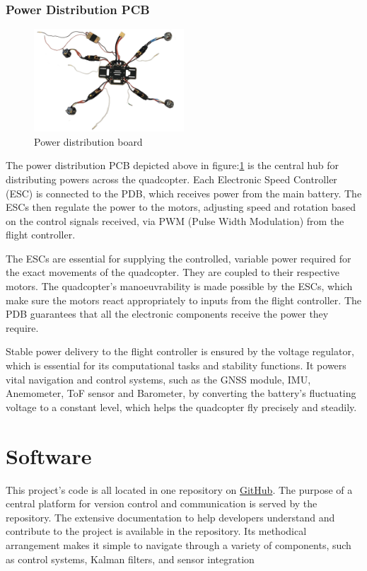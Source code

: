 \documentclass{article}
\begin{document}
\subsubsection{Power Distribution PCB}
\begin{figure}[H]
  \centering
  \includegraphics[width=0.5\textwidth]{Pictures/power_distribution_and_escs.png}
  \caption{Power distribution board}
  \label{fig:power_distribution}
\end{figure}
The power distribution PCB depicted above in figure:\ref{fig:power_distribution}
is the central hub for distributing powers across the quadcopter. Each
Electronic Speed Controller (ESC) is connected to the PDB, which receives power
from the main battery. The ESCs then regulate the power to the motors, adjusting
speed and rotation based on the control signals received, via PWM (Pulse Width
Modulation) from the flight controller.

The ESCs are essential for supplying the controlled, variable power required for
the exact movements of the quadcopter. They are coupled to their respective
motors. The quadcopter's manoeuvrability is made possible by the ESCs, which
make sure the motors react appropriately to inputs from the flight controller.
The PDB guarantees that all the electronic components receive the power they
require.

Stable power delivery to the flight controller is ensured by the voltage
regulator, which is essential for its computational tasks and stability
functions. It powers vital navigation and control systems, such as the GNSS
module, IMU, Anemometer, ToF sensor and Barometer, by converting the battery's
fluctuating voltage to a constant level, which helps the quadcopter fly
precisely and steadily.

\section{Software}                                                                           
This project’s code is all located in one repository on
\href{https://github.com/QUB-ASL/bzzz}{GitHub}. The purpose of a central
platform for version control and communication is served by the repository. The
extensive documentation to help developers understand and contribute to the
project is available in the repository.  Its methodical arrangement makes it
simple to navigate through a variety of components, such as control systems,
Kalman filters, and sensor integration
\end{document}

